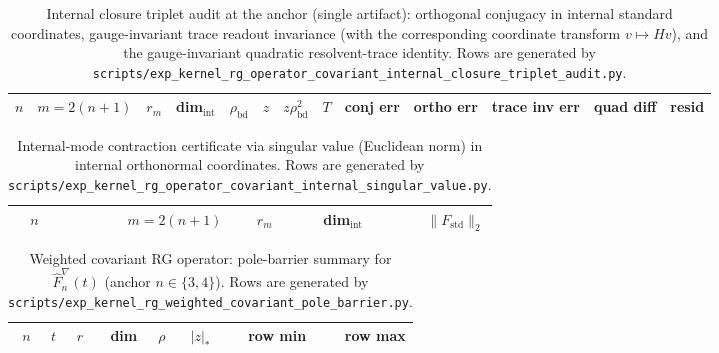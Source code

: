 \begin{table}[H]
\centering
\scriptsize
\setlength{\tabcolsep}{6pt}
\renewcommand{\arraystretch}{1.15}
\begin{tabular}{rrrrrrrrrrrrr}
\toprule
$n$ & $m=2(n+1)$ & $r_m$ & dim$_{\mathrm{int}}$ & $\rho_{\mathrm{bd}}$ & $z$ & $z\rho_{\mathrm{bd}}^2$ & $T$ & conj err & ortho err & trace inv err & quad diff & resid \\
\midrule
%
\end{tabular}
\caption{Internal closure triplet audit at the anchor (single artifact):
orthogonal conjugacy in internal standard coordinates, gauge-invariant trace readout invariance (with the corresponding coordinate transform $v\mapsto Hv$), and the gauge-invariant quadratic resolvent-trace identity.
Rows are generated by \texttt{scripts/exp\_kernel\_rg\_operator\_covariant\_internal\_closure\_triplet\_audit.py}.}
\label{tab:kernel_rg_operator_covariant_internal_closure_triplet}
\end{table}

\begin{table}[H]
\centering
\scriptsize
\setlength{\tabcolsep}{6pt}
\renewcommand{\arraystretch}{1.15}
\begin{tabular}{rrrrr}
\toprule
$n$ & $m=2(n+1)$ & $r_m$ & dim$_{\mathrm{int}}$ & $\|F_{\mathrm{std}}\|_2$ \\
\midrule
%
\end{tabular}
\caption{Internal-mode contraction certificate via singular value (Euclidean norm) in internal orthonormal coordinates.
Rows are generated by \texttt{scripts/exp\_kernel\_rg\_operator\_covariant\_internal\_singular\_value.py}.}
\label{tab:kernel_rg_operator_covariant_internal_sigma}
\end{table}

\begin{table}[H]
\centering
\scriptsize
\setlength{\tabcolsep}{6pt}
\renewcommand{\arraystretch}{1.15}
\begin{tabular}{rrrrrrrr}
\toprule
$n$ & $t$ & $r$ & dim & $\rho$ & $|z|_\ast$ & row min & row max \\
\midrule
%
\end{tabular}
\caption{Weighted covariant RG operator: pole-barrier summary for $\widehat F_n^\nabla(t)$ (anchor $n\in\{3,4\}$).
Rows are generated by \texttt{scripts/exp\_kernel\_rg\_weighted\_covariant\_pole\_barrier.py}.}
\label{tab:kernel_rg_weighted_covariant_pole_barrier}
\end{table}

